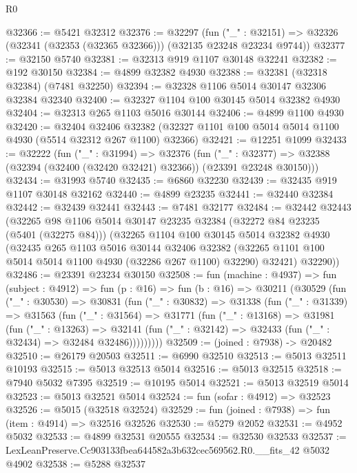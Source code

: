 \begin{lexlean}{R0}
\begin{coremodule}
@32366 := @5421 @32312
@32376 := @32297
    (fun ("_" : @32151) => @32326 (@32341 (@32353 (@32365 @32366))) (@32135 @23248 @23234 @9744))
@32377 := @32150 @5740
@32381 := @32313 @919 @1107 @30148 @32241
@32382 := @192 @30150
@32384 := @4899 @32382 @4930
@32388 := @32381 (@32318 @32384) (@7481 @32250)
@32394 := @32328 @1106 @5014 @30147 @32306 @32384 @32340
@32400 := @32327 @1104 @100 @30145 @5014 @32382 @4930
@32404 := @32313 @265 @1103 @5016 @30144
@32406 := @4899 @1100 @4930
@32420 := @32404
    @32406
    @32382
    (@32327 @1101 @100 @5014 @5014 @1100 @4930 (@5514 @32312 @267 @1100) @32366)
@32421 := @12251 @1099
@32433 := @32222
    (fun ("_" : @31994) =>
    @32376
      (fun ("_" : @32377) =>
      @32388 (@32394 (@32400 (@32420 @32421) @32366)) (@23391 @23248 @30150)))
@32434 := @31993 @5740
@32435 := @6860 @32230
@32439 := @32435 @919 @1107 @30148 @32162
@32440 := @4899 @23235
@32441 := @32440 @32384
@32442 := @32439 @32441
@32443 := @7481 @32177
@32484 := @32442
    @32443
    (@32265
      @98
      @1106
      @5014
      @30147
      @23235
      @32384
      (@32272 @84 @23235 (@5401 (@32275 @84)))
      (@32265
        @1104
        @100
        @30145
        @5014
        @32382
        @4930
        (@32435
          @265
          @1103
          @5016
          @30144
          @32406
          @32382
          (@32265 @1101 @100 @5014 @5014 @1100 @4930 (@32286 @267 @1100) @32290)
          @32421)
        @32290))
@32486 := @23391 @23234 @30150
@32508 := fun (machine : @4937) =>
  fun (subject : @4912) =>
  fun (p : @16) =>
  fun (b : @16) =>
  @30211
    (@30529
      (fun ("_" : @30530) =>
      @30831
        (fun ("_" : @30832) =>
        @31338
          (fun ("_" : @31339) =>
          @31563
            (fun ("_" : @31564) =>
            @31771
              (fun ("_" : @13168) =>
              @31981
                (fun ("_" : @13263) =>
                @32141 (fun ("_" : @32142) => @32433 (fun ("_" : @32434) => @32484 @32486)))))))))
@32509 := (joined : @7938) -> @20482
@32510 := @26179 @20503
@32511 := @6990 @32510
@32513 := @5013 @32511 @10193
@32515 := @5013 @32513 @5014
@32516 := @5013 @32515
@32518 := @7940 @5032 @7395
@32519 := @10195 @5014
@32521 := @5013 @32519 @5014
@32523 := @5013 @32521 @5014
@32524 := fun (sofar : @4912) => @32523
@32526 := @5015 (@32518 @32524)
@32529 := fun (joined : @7938) => fun (item : @4914) => @32516 @32526
@32530 := @5279 @2052
@32531 := @4952 @5032
@32533 := @4899 @32531 @20555
@32534 := @32530 @32533
@32537 := LexLeanPreserve.Cc903133fbea644582a3b632cec569562.R0.__fits_42 @5032 @4902
@32538 := @5288 @32537

\end{coremodule}
\end{lexlean}
